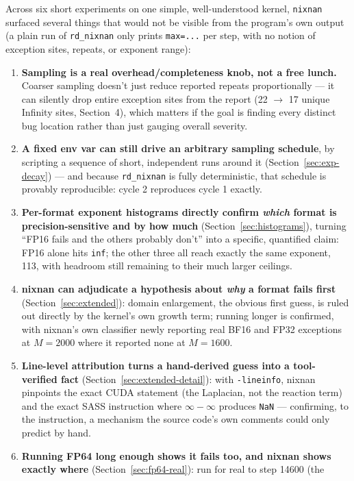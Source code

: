 \documentclass[11pt]{article}
\begin{document}
Across six short experiments on one simple, well-understood kernel, \texttt{nixnan}
surfaced several things that would not be visible from the program's own output (a plain
run of \texttt{rd\_nixnan} only prints \texttt{max=...} per step, with no notion of
exception sites, repeats, or exponent range):
\begin{enumerate}
\item \textbf{Sampling is a real overhead/completeness knob, not a free lunch.} Coarser
  sampling doesn't just reduce reported repeats proportionally --- it can silently drop
  entire exception sites from the report (22 $\to$ 17 unique Infinity sites,
  Section~4), which matters if the goal is finding every distinct bug location rather
  than just gauging overall severity.
\item \textbf{A fixed env var can still drive an arbitrary sampling schedule}, by
  scripting a sequence of short, independent runs around it (Section~\ref{sec:exp-decay})
  --- and because \texttt{rd\_nixnan} is fully deterministic, that schedule is provably
  reproducible: cycle 2 reproduces cycle 1 exactly.
\item \textbf{Per-format exponent histograms directly confirm \emph{which} format is
  precision-sensitive and by how much} (Section~\ref{sec:histograms}), turning ``FP16
  fails and the others probably don't'' into a specific, quantified claim: FP16 alone
  hits \texttt{inf}; the other three all reach exactly the same exponent, 113, with
  headroom still remaining to their much larger ceilings.
\item \textbf{nixnan can adjudicate a hypothesis about \emph{why} a format fails
  first} (Section~\ref{sec:extended}): domain enlargement, the obvious first guess,
  is ruled out directly by the kernel's own growth term; running longer is confirmed,
  with nixnan's own classifier newly reporting real BF16 and FP32 exceptions at
  $M{=}2000$ where it reported none at $M{=}1600$.
\item \textbf{Line-level attribution turns a hand-derived guess into a tool-verified
  fact} (Section~\ref{sec:extended-detail}): with \texttt{-lineinfo}, nixnan pinpoints
  the exact CUDA statement (the Laplacian, not the reaction term) and the exact SASS
  instruction where $\infty-\infty$ produces \texttt{NaN} --- confirming, to the
  instruction, a mechanism the source code's own comments could only predict by hand.
\item \textbf{Running FP64 long enough shows it fails too, and nixnan shows exactly
  where} (Section~\ref{sec:fp64-real}): run for real to step 14600 (the

\end{enumerate}
\end{document}
